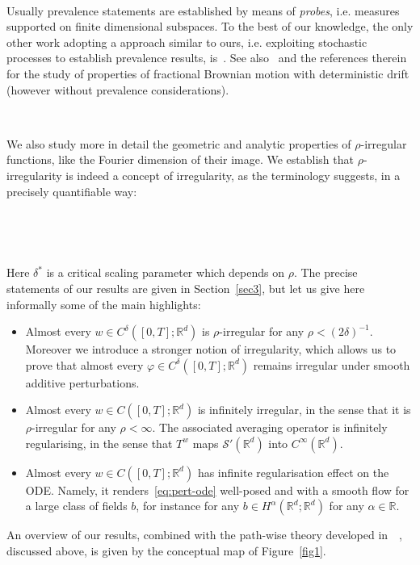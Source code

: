 \documentclass[10pt]{article}
\newcommand{\tmtextit}[1]{{\itshape{#1}}}
\begin{document}
\

Usually prevalence statements are established by means of \tmtextit{probes},
i.e. measures supported on finite dimensional subspaces. To the best of our
knowledge, the only other work adopting a approach similar to ours, i.e.
exploiting stochastic processes to establish prevalence results,
is~{\cite{bayart}}. See also~{\cite{peres}} and the references therein for the
study of properties of fractional Brownian motion with deterministic drift
(however without prevalence considerations).

\

We also study more in detail the geometric and analytic properties of
$\rho$-irregular functions, like the Fourier dimension of their image. We
establish that $\rho$-irregularity is indeed a concept of irregularity, as the
terminology suggests, in a precisely quantifiable way:

\

\begin{center}
\end{center}

\

Here $\delta^{\ast}$ is a critical scaling parameter which depends on $\rho$.
The precise statements of our results are given in Section~\ref{sec3}, but let
us give here informally some of the main highlights:
\begin{itemize}
  \item Almost every $w \in C^{\delta} ([0, T] ; \mathbb{R}^d)$ is
  $\rho$-irregular for any $\rho < (2 \delta)^{- 1}$. Moreover we introduce a
  stronger notion of irregularity, which allows us to prove that almost every
  $\varphi \in C^{\delta} ([0, T] ; \mathbb{R}^d)$ remains irregular under
  smooth additive perturbations.
  
  \item Almost every $w \in C ([0, T] ; \mathbb{R}^d)$ is infinitely
  irregular, in the sense that it is $\rho$-irregular for any $\rho < \infty$.
  The associated averaging operator is infinitely regularising, in the sense
  that $T^w$ maps $\mathcal{S}' (\mathbb{R}^d)$ into $C^{\infty}
  (\mathbb{R}^d)$.
  
  \item Almost every $w \in C ([0, T] ; \mathbb{R}^d)$ has infinite
  regularisation effect on the ODE. Namely, it renders~{\eqref{eq:pert-ode}}
  well-posed and with a smooth flow for a large class of fields $b$, for
  instance for any $b \in H^{\alpha} (\mathbb{R}^d ; \mathbb{R}^d)$ for any
  $\alpha \in \mathbb{R}$.
\end{itemize}
An overview of our results, combined with the path-wise theory developed
in~{\cite{catelliergubinelli}}~{\cite{choukgubinelli1}},
{\cite{choukgubinelli2}} discussed above, is given by the conceptual map of
Figure~\ref{fig1}.
\end{document}
